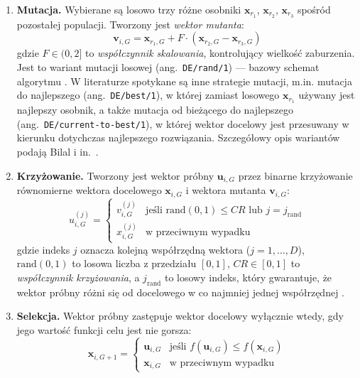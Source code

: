 \begin{enumerate}
    \item \textbf{Mutacja.} Wybierane są losowo trzy różne osobniki $\mathbf{x}_{r_1}$, $\mathbf{x}_{r_2}$, $\mathbf{x}_{r_3}$ spośród pozostałej populacji. Tworzony jest \textit{wektor mutanta}:
    \[
    \mathbf{v}_{i,G} = \mathbf{x}_{r_1,G} + F \cdot (\mathbf{x}_{r_2,G} - \mathbf{x}_{r_3,G})
    \]
    gdzie $F \in (0, 2]$ to \textit{współczynnik skalowania}, kontrolujący wielkość zaburzenia. Jest to wariant mutacji losowej (ang.~\texttt{DE/rand/1}) --- bazowy schemat algorytmu \cite{Storn1997}. W literaturze spotykane są inne strategie mutacji, m.in. mutacja do najlepszego (ang.~\texttt{DE/best/1}), w której zamiast losowego $\mathbf{x}_{r_1}$ używany jest najlepszy osobnik, a także mutacja od bieżącego do najlepszego (ang.~\texttt{DE/current-to-best/1}), w której wektor docelowy jest przesuwany w kierunku dotychczas najlepszego rozwiązania. Szczegółowy opis wariantów podają Bilal i in.~\cite{Bilal2020}.

    \item \textbf{Krzyżowanie.} Tworzony jest wektor próbny $\mathbf{u}_{i,G}$ przez binarne krzyżowanie równomierne wektora docelowego $\mathbf{x}_{i,G}$ i wektora mutanta $\mathbf{v}_{i,G}$:
    \[
    u_{i,G}^{(j)} =
    \begin{cases}
    v_{i,G}^{(j)} & \text{jeśli } \mathrm{rand}(0,1) \leq CR \text{ lub } j = j_{\mathrm{rand}} \\
    x_{i,G}^{(j)} & \text{w przeciwnym wypadku}
    \end{cases}
    \]
    gdzie indeks $j$ oznacza kolejną współrzędną wektora ($j = 1, \ldots, D$), $\mathrm{rand}(0,1)$ to losowa liczba z przedziału $[0, 1]$, $CR \in [0, 1]$ to \textit{współczynnik krzyżowania}, a $j_{\mathrm{rand}}$ to losowy indeks, który gwarantuje, że wektor próbny różni się od docelowego w co najmniej jednej współrzędnej \cite{Storn1997}.

    \item \textbf{Selekcja.} Wektor próbny zastępuje wektor docelowy wyłącznie wtedy, gdy jego wartość funkcji celu jest nie gorsza:
    \[
    \mathbf{x}_{i,G+1} =
    \begin{cases}
    \mathbf{u}_{i,G} & \text{jeśli } f(\mathbf{u}_{i,G}) \leq f(\mathbf{x}_{i,G}) \\
    \mathbf{x}_{i,G} & \text{w przeciwnym wypadku}
    \end{cases}
    \]
\end{enumerate}

